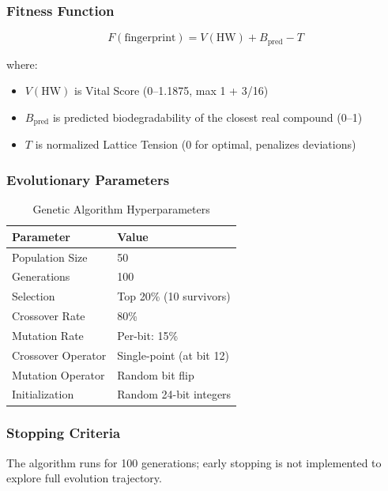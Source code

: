 \documentclass[11pt,letterpaper]{article}
\begin{document}
\subsubsection{Fitness Function}

\begin{equation}
F(\text{fingerprint}) = V(\text{HW}) + B_{\text{pred}} - T
\end{equation}

where:
\begin{itemize}
    \item $V(\text{HW})$ is Vital Score (0--1.1875, max 1 + 3/16)
    \item $B_{\text{pred}}$ is predicted biodegradability of the closest real compound (0--1)
    \item $T$ is normalized Lattice Tension (0 for optimal, penalizes deviations)
\end{itemize}

\subsubsection{Evolutionary Parameters}

\begin{table}[H]
\centering
\caption{Genetic Algorithm Hyperparameters}
\begin{tabular}{ll}
\toprule
\textbf{Parameter} & \textbf{Value} \\
\midrule
Population Size & 50 \\
Generations & 100 \\
Selection & Top 20\% (10 survivors) \\
Crossover Rate & 80\% \\
Mutation Rate & Per-bit: 15\% \\
Crossover Operator & Single-point (at bit 12) \\
Mutation Operator & Random bit flip \\
Initialization & Random 24-bit integers \\
\bottomrule
\end{tabular}
\end{table}

\subsubsection{Stopping Criteria}

The algorithm runs for 100 generations; early stopping is not implemented to explore full evolution trajectory.
\end{document}
